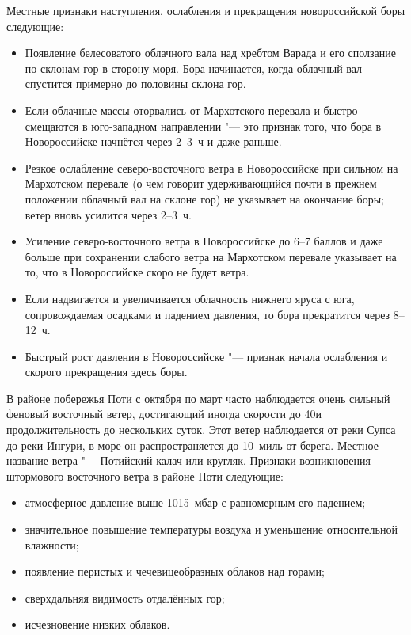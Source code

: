 Местные признаки наступления, ослабления и прекращения новороссийской
боры следующие:
\begin{itemize}
\item Появление белесоватого облачного вала над хребтом Варада и его
  сползание по склонам гор в сторону моря. Бора начинается, когда
  облачный вал спустится примерно до половины склона гор.
\item Если облачные массы оторвались от Мархотского перевала и быстро
  смещаются в юго-западном направлении "--- это признак того, что бора в
  Новороссийске начнётся через 2--3~ч и даже раньше.
\item Резкое ослабление северо-восточного ветра в Новороссийске при
  сильном на Мархотском перевале (о чем говорит удерживающийся почти в
  прежнем положении облачный вал на склоне гор) не указывает на
  окончание боры; ветер вновь усилится через 2--3~ч.
\item Усиление северо-восточного ветра в Новороссийске до 6--7 баллов и
  даже больше при сохранении слабого ветра на Мархотском перевале
  указывает на то, что в Новороссийске скоро не будет ветра.
\item Если надвигается и увеличивается облачность нижнего яруса с юга,
  сопровождаемая осадками и падением давления, то бора прекратится
  через 8--12~ч.
\item Быстрый рост давления в Новороссийске "--- признак начала ослабления
  и скорого прекращения здесь боры.
\end{itemize}
  
В районе побережья Поти с октября по март часто наблюдается очень
сильный феновый восточный ветер, достигающий иногда скорости до
40\speedms и продолжительность до нескольких суток. Этот ветер
наблюдается от реки Супса до реки Ингури, в море он распространяется
до 10~миль от берега. Местное название ветра "--- Потийский калач или
кругляк. Признаки возникновения штормового восточного ветра в районе
Поти следующие:
\begin{itemize}
\item атмосферное давление выше 1015~мбар с равномерным его падением;
\item значительное повышение температуры воздуха и уменьшение
  относительной влажности;
\item появление перистых и чечевицеобразных облаков над горами;
\item сверхдальняя видимость отдалённых гор;
\item исчезновение низких облаков.
\end{itemize}

